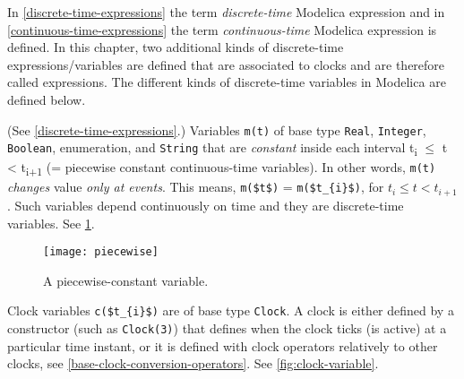 
In \cref{discrete-time-expressions} the term \emph{discrete-time} Modelica expression and in \cref{continuous-time-expressions} the term \emph{continuous-time} Modelica expression is defined.
In this chapter, two additional kinds of discrete-time expressions/variables are defined that are associated to clocks and are therefore called  expressions.  The
different kinds of discrete-time variables in Modelica are defined below.

\begin{definition}
(See \cref{discrete-time-expressions}.)  Variables \lstinline!m(t)! of base type \lstinline!Real!, \lstinline!Integer!, \lstinline!Boolean!, enumeration, and \lstinline!String! that are
\emph{constant} inside each interval t\textsubscript{i} $\le$ t \textless{} t\textsubscript{i+1} (= piecewise constant continuous-time variables).  In other words, \lstinline!m(t)! \emph{changes}
value \emph{only at events}.  This means, \lstinline!m($t$)! = \lstinline!m($t_{i}$)!, for $t_{i} \leq t < t_{i+1}$.  Such variables depend continuously on time and they are discrete-time variables.
See \cref{fig:piecewise-constant-variable}.
\end{definition}

\begin{figure}[H]
  \begin{center}
    \texttt{[image: piecewise]}
  \end{center}
  \caption{A piecewise-constant variable.}\label{fig:piecewise-constant-variable}
\end{figure}

\begin{definition}
Clock variables \lstinline!c($t_{i}$)! are of base type \lstinline!Clock!.  A clock is either defined by a constructor (such as \lstinline!Clock(3)!) that defines when the clock ticks (is active) at
a particular time instant, or it is defined with clock operators relatively to other clocks, see \cref{base-clock-conversion-operators}.  See \cref{fig:clock-variable}.
\end{definition}

